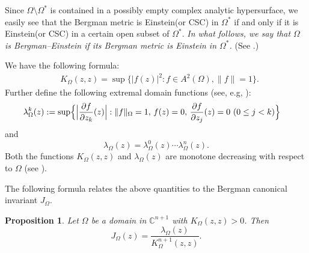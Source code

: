 \documentclass[a4paper,centertags,oneside,12pt]{amsart}
\newcommand{\sm}{\setminus}
\newtheorem{proposition}[theorem]{Proposition}
\numberwithin{equation}{section}
\begin{document}
Since $\Omega\sm \Omega^*$ is contained in a possibly empty complex analytic hypersurface, 
we easily see that the Bergman metric is Einstein(or CSC) in $\Omega^*$ if and only if it is Einstein(or CSC) in a certain open subset of $\Omega^*$. {\it In what follows, we  say that $\Omega$ is Bergman--Einstein if its Bergman metric is Einstein in $\Omega^*$.} (See \cite{HJL25}.)

We have  the following formula:
\begin{equation*}
\begin{split}
    &K_\Omega(z, z)=\sup\{|f(z)|^2:f\in A^2(\Omega),\|f\|=1\}.
\end{split}
\end{equation*}
Further define the following  extremal domain functions (see, e.g, \cite{KYu96} \cite{James}):
\begin{equation*}
\begin{split}
    &\lambda_{\Omega}^k(z):=\sup\Bigl\{\Bigl|\frac{\partial f}{\partial z_k}(z)\Bigr|:\|f\|_{\Omega}=1,\,f(z)=0,\,\frac{\partial f}{\partial z_j}(z)=0\ (0\le j<k)\Bigr\}
\end{split}
\end{equation*}
and $$\lambda_{\Omega}(z)=\lambda^0_\Omega(z)\cdots\lambda^n_\Omega(z).$$
Both the functions $K_{\Omega}(z,  z)$ and $\lambda_{\Omega}(z)$ are monotone decreasing with respect to $\Omega$ (see \cite[Prop 2.2]{KYu96}).

The following formula  relates  the above quantities to the Bergman canonical invariant   $J_{\Omega}$.

\begin{proposition}\cite{KYu96, James}\label{Prop 1-3-31}
Let $\Omega$ be a domain in $\mathbb C^{n+1}$ with $K_{\Omega}(z, z)>0$.  Then
\begin{equation*}
J_{\Omega}(z)=\dfrac{\lambda_{\Omega}(z)}{K^{n+1}_{\Omega}(z, z)}.
\end{equation*}
\end{proposition}
\end{document}
